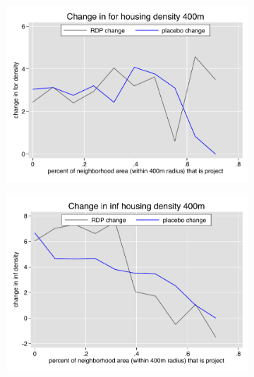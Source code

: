 \documentclass[12pt]{article}
\begin{document}
\begin{figure}
\begin{subfigure}[b]{0.495\textwidth}
        \end{subfigure}
        \vspace{-6mm}
        \begin{subfigure}[b]{0.495\textwidth}
            \centering
            \includegraphics[width=\textwidth,trim={0.3cm .3cm 0.1cm 0cm}, clip=true]{figures/change_for_400_local.pdf}
        \end{subfigure}
        \hfill
        \begin{subfigure}[b]{0.495\textwidth}  
            \centering 
            \includegraphics[width=\textwidth,trim={0.3cm .3cm 0.1cm 0cm}, clip=true]{figures/change_inf_400_local.pdf}
        \end{subfigure}
        \vspace{-6mm}
    \end{figure} 
\end{document}
